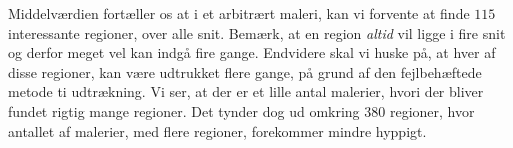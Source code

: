 {Middelværdien fortæller os at i et arbitrært maleri, kan vi forvente at
finde $115$ interessante regioner, over alle snit.  Bemærk, at en region
\emph{altid} vil ligge i fire snit og derfor meget vel kan indgå fire
gange. Endvidere skal vi huske på, at hver af disse regioner, kan være
udtrukket flere gange, på grund af den fejlbehæftede metode ti
udtrækning. Vi ser, at der er et lille antal malerier, hvori der bliver
fundet rigtig mange regioner. Det tynder dog ud omkring $380$ regioner,
hvor antallet af malerier, med flere regioner, forekommer mindre
hyppigt.

}

